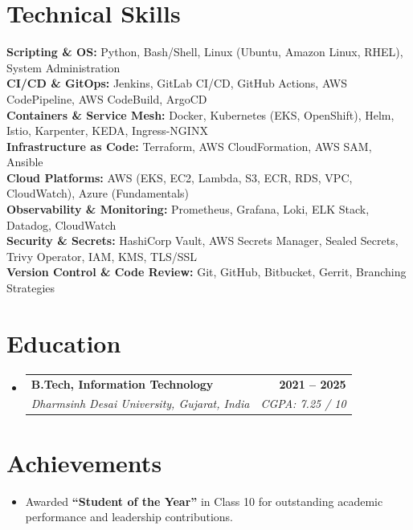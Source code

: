 \documentclass[letterpaper,11pt]{article}
\makeatletter
\newcommand{\resumeItem}[1]{
  \item\small{
    {#1 \vspace{-3pt}}
  }
}
\newcommand{\resumeSubheading}[4]{
  \vspace{-3pt}\item
    \begin{tabular*}{1.0\textwidth}[t]{l@{\extracolsep{\fill}}r}
      \textbf{#1} & \textbf{\small #2} \\
      \textit{\small#3} & \textit{\small #4} \\
    \end{tabular*}\vspace{-7pt}
}
\newcommand{\resumeSubHeadingListStart}{\begin{itemize}[leftmargin=0.0in, label={}]}
\newcommand{\resumeSubHeadingListEnd}{\end{itemize}}
\newcommand{\resumeItemListStart}{\begin{itemize}}
\newcommand{\resumeItemListEnd}{\end{itemize}\vspace{0pt}}
\makeatother
\begin{document}
\section{Technical Skills}
\vspace{-7pt}
\begin{itemize}[leftmargin=0.15in, label={}]\small{\item{
  \textbf{Scripting \& OS:} Python, Bash/Shell, Linux (Ubuntu, Amazon Linux, RHEL), System Administration \\
  \textbf{CI/CD \& GitOps:} Jenkins, GitLab CI/CD, GitHub Actions, AWS CodePipeline, AWS CodeBuild, ArgoCD \\
  \textbf{Containers \& Service Mesh:} Docker, Kubernetes (EKS, OpenShift), Helm, Istio, Karpenter, KEDA, Ingress-NGINX \\
  \textbf{Infrastructure as Code:} Terraform, AWS CloudFormation, AWS SAM, Ansible \\
  \textbf{Cloud Platforms:} AWS (EKS, EC2, Lambda, S3, ECR, RDS, VPC, CloudWatch), Azure (Fundamentals) \\
  \textbf{Observability \& Monitoring:} Prometheus, Grafana, Loki, ELK Stack, Datadog, CloudWatch \\
  \textbf{Security \& Secrets:} HashiCorp Vault, AWS Secrets Manager, Sealed Secrets, Trivy Operator, IAM, KMS, TLS/SSL \\
  \textbf{Version Control \& Code Review:} Git, GitHub, Bitbucket, Gerrit, Branching Strategies
}}
\end{itemize}

\section{Education}
  \resumeSubHeadingListStart
    \resumeSubheading
      {B.Tech, Information Technology}{2021 -- 2025}
      {Dharmsinh Desai University, Gujarat, India}{CGPA: 7.25 / 10}
  \resumeSubHeadingListEnd

\section{Achievements}
\resumeSubHeadingListStart
  \resumeItemListStart
    \resumeItem{Awarded \textbf{``Student of the Year''} in Class 10 for outstanding academic performance and leadership contributions.}
  \resumeItemListEnd
\resumeSubHeadingListEnd
\end{document}
